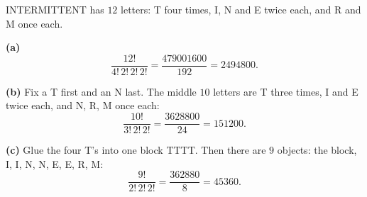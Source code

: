 INTERMITTENT has $12$ letters: T four times, I, N and E twice each, and R and M once each.

\textbf{(a)}
\[
\dfrac{12!}{4!\,2!\,2!\,2!}=\dfrac{479001600}{192}=\boxed{2494800}.
\]

\textbf{(b)} Fix a T first and an N last. The middle $10$ letters are T three times, I and E twice each, and N, R, M once each:
\[
\dfrac{10!}{3!\,2!\,2!}=\dfrac{3628800}{24}=\boxed{151200}.
\]

\textbf{(c)} Glue the four T's into one block TTTT. Then there are $9$ objects: the block, I, I, N, N, E, E, R, M:
\[
\dfrac{9!}{2!\,2!\,2!}=\dfrac{362880}{8}=\boxed{45360}.
\]
